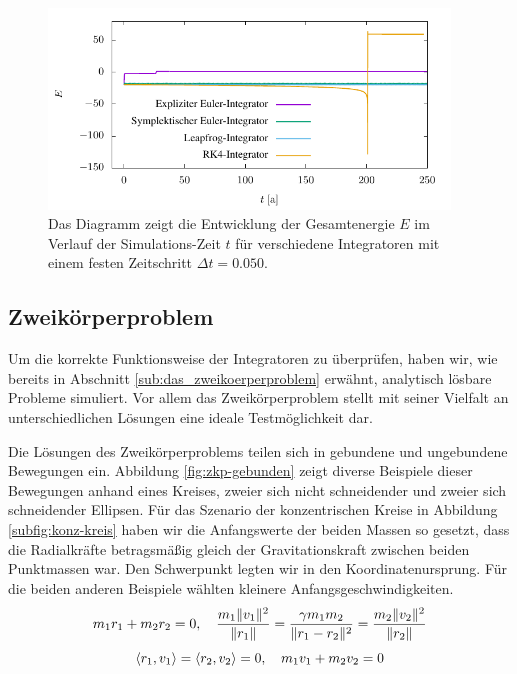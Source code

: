     \begin{figure}[p]
      \center
      \includegraphics[width=0.95\textwidth]{plots/sun_earth_5_plot.pdf}
      \caption{Das Diagramm zeigt die Entwicklung der Gesamtenergie $E$ im Verlauf der Simulations-Zeit $t$ für verschiedene Integratoren mit einem festen Zeitschritt $\Delta t = 0.050$.}
      \label{fig:e5}
    \end{figure}


  \subsection{Zweikörperproblem} %
  \label{sub:zweikörperproblem}

    Um die korrekte Funktionsweise der Integratoren zu überprüfen, haben wir, wie bereits in Abschnitt \ref{sub:das_zweikoerperproblem} erwähnt, analytisch lösbare Probleme simuliert.
    Vor allem das Zweikörperproblem stellt mit seiner Vielfalt an unterschiedlichen Lösungen eine ideale Testmöglichkeit dar.

    Die Lösungen des Zweikörperproblems teilen sich in gebundene und ungebundene Bewegungen ein.
    Abbildung \ref{fig:zkp-gebunden} zeigt diverse Beispiele dieser Bewegungen anhand eines Kreises, zweier sich nicht schneidender und zweier sich schneidender Ellipsen.
    Für das Szenario der konzentrischen Kreise in Abbildung \ref{subfig:konz-kreis} haben wir die Anfangswerte der beiden Massen so gesetzt, dass die Radialkräfte betragsmäßig gleich der Gravitationskraft zwischen beiden Punktmassen war.
    Den Schwerpunkt legten wir in den Koordinatenursprung.
    Für die beiden anderen Beispiele wählten kleinere Anfangsgeschwindigkeiten.
    \[
      m_1r_1 + m_2r_2 = 0
      ,\quad
      \frac{m_1\|v_1\|^2}{\|r_1\|} = \frac{\gamma m_1m_2}{\|r_1-r_2\|^2} = \frac{m_2\|v_2\|^2}{\|r_2\|}
    \]
    \[
      \left\langle r_1,v_1\right\rangle = \left\langle r_2,v_2\right\rangle = 0
      ,\quad
      m_1v_1 + m_2v_2 = 0
    \]

